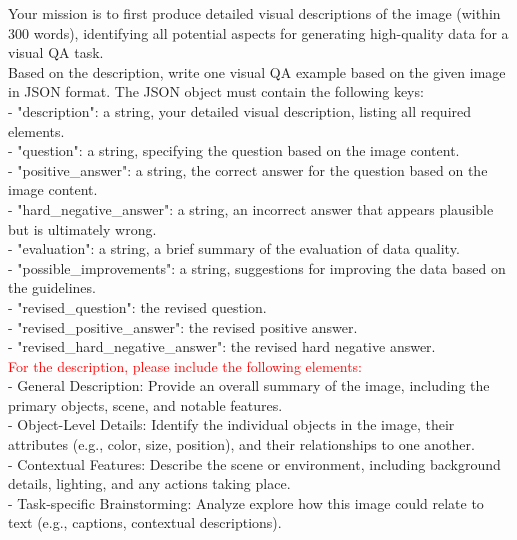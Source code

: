 \begin{figure*}[t]
\centering
\begin{prompt}[title={Prompt: Synthesizing VQA Data}, label=prompt:vqa]

Your mission is to first produce detailed visual descriptions of the image (within 300 words), identifying all potential aspects for generating high-quality data for a visual QA task. \\
    
Based on the description, write one visual QA example based on the given image in JSON format. The JSON object must contain the following keys: \\

- "description": a string, your detailed visual description, listing all required elements.\\
- "question": a string, specifying the question based on the image content.\\
- "positive\_answer": a string, the correct answer for the question based on the image content.\\
- "hard\_negative\_answer": a string, an incorrect answer that appears plausible but is ultimately wrong.\\
- "evaluation": a string, a brief summary of the evaluation of data quality.\\
- "possible\_improvements": a string, suggestions for improving the data based on the guidelines.\\
- "revised\_question": the revised question.\\
- "revised\_positive\_answer": the revised positive answer.\\
- "revised\_hard\_negative\_answer": the revised hard negative answer.\\

\textcolor{red}{For the description, please include the following elements:}\\
- General Description: Provide an overall summary of the image, including the primary objects, scene, and notable features.\\
- Object-Level Details: Identify the individual objects in the image, their attributes (e.g., color, size, position), and their relationships to one another.\\
- Contextual Features: Describe the scene or environment, including background details, lighting, and any actions taking place.\\
- Task-specific Brainstorming: Analyze explore how this image could relate to text (e.g., captions, contextual descriptions).\\


\end{prompt}
\end{figure*}
